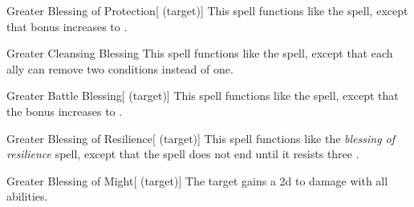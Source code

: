 \lowercase{\hypertarget{spell:Greater Blessing of Protection}{}}\label{spell:Greater Blessing of Protection}
\begin{attuneability}[\nth{4}]{\hypertarget{spell:Greater Blessing of Protection}{Greater Blessing of Protection}}[ (target)]
This spell functions like the  spell, except that bonus increases to .
\end{attuneability}
\vspace{0.25em}



\lowercase{\hypertarget{spell:Greater Cleansing Blessing}{}}\label{spell:Greater Cleansing Blessing}
\begin{apability}[\nth{4}]{\hypertarget{spell:Greater Cleansing Blessing}{Greater Cleansing Blessing}}
This spell functions like the  spell, except that each ally can remove two conditions instead of one.
\end{apability}
\vspace{0.25em}



\lowercase{\hypertarget{spell:Greater Battle Blessing}{}}\label{spell:Greater Battle Blessing}
\begin{attuneability}[\nth{5}]{\hypertarget{spell:Greater Battle Blessing}{Greater Battle Blessing}}[ (target)]
This spell functions like the  spell, except that the bonus increases to .
\end{attuneability}
\vspace{0.25em}



\lowercase{\hypertarget{spell:Greater Blessing of Resilience}{}}\label{spell:Greater Blessing of Resilience}
\begin{attuneability}[\nth{5}]{\hypertarget{spell:Greater Blessing of Resilience}{Greater Blessing of Resilience}}[ (target)]
This spell functions like the \textit{blessing of resilience} spell, except that the spell does not end until it resists three .
\end{attuneability}
\vspace{0.25em}



\lowercase{\hypertarget{spell:Greater Blessing of Might}{}}\label{spell:Greater Blessing of Might}
\begin{attuneability}[\nth{6}]{\hypertarget{spell:Greater Blessing of Might}{Greater Blessing of Might}}[ (target)]
The target gains a \plus2d  to damage with all abilities.
\end{attuneability}
\vspace{0.25em}




